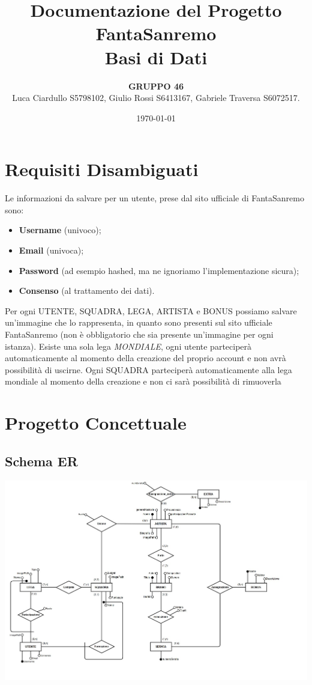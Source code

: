 \documentclass[a4paper, 12pt]{article}
\title{
    Documentazione del Progetto FantaSanremo \\
    \large Basi di Dati
}
\author{
    \textbf{GRUPPO 46} \\
    \vspace{1em}
    {\small
    Luca Ciardullo S5798102,
    Giulio Rossi S6413167,
    Gabriele Traversa S6072517.
    }
}
\date{\today}
\begin{document}
\maketitle
\tableofcontents
\newpage

\section{Requisiti Disambiguati}
Le informazioni da salvare per un utente, prese dal sito ufficiale di FantaSanremo sono:
\begin{itemize}
    \item \textbf{Username} (univoco);
    \item \textbf{Email} (univoca);
    \item \textbf{Password} (ad esempio hashed, ma ne ignoriamo l'implementazione sicura);
    \item \textbf{Consenso} (al trattamento dei dati).
\end{itemize}

\noindent Per ogni UTENTE, SQUADRA, LEGA, ARTISTA e BONUS possiamo salvare un'immagine che lo rappresenta, in quanto sono presenti sul sito ufficiale FantaSanremo (non è obbligatorio che sia presente un'immagine per ogni istanza).
\newline Esiste una sola lega \textit{MONDIALE}, ogni utente parteciperà automaticamente al momento della creazione del proprio account e non avrà possibilità di uscirne.
\newline Ogni SQUADRA parteciperà automaticamente alla lega mondiale al momento della creazione e non ci sarà possibilità di rimuoverla
\newpage
\section{Progetto Concettuale}


\subsection{Schema ER}
\includegraphics[width=\textwidth]{er-schema.jpeg}
\end{document}
